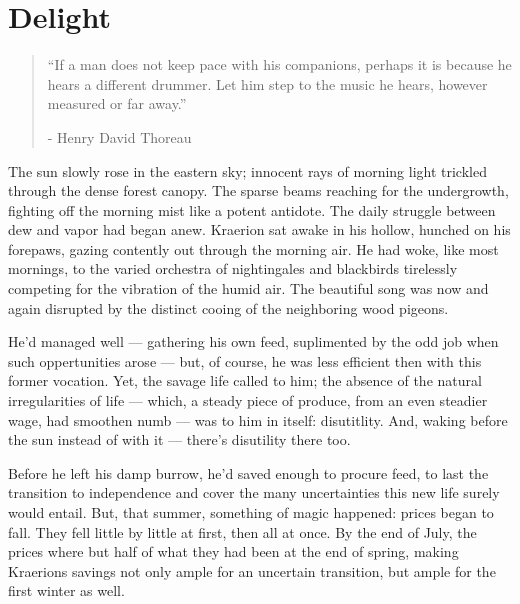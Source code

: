 \chapter{Delight}

\vspace{-1.3cm}
\begin{localsize}{10}
	\begin{quote}
		“If a man does not keep pace with his companions, perhaps it is because he hears a different drummer. Let him step to the music he hears, however measured or far away.”
		\begin{flushright}- Henry David Thoreau \end{flushright}
	\end{quote} 
\end{localsize}
\vspace{1cm}





The sun slowly rose in the eastern sky; innocent rays of morning light trickled through the dense forest canopy. The sparse beams reaching for the undergrowth, fighting off the morning mist like a potent antidote. The daily struggle between dew and vapor had began anew. Kraerion sat awake in his hollow, hunched on his forepaws, gazing contently out through the morning air. He had woke, like most mornings, to the varied orchestra of nightingales and blackbirds tirelessly competing for the vibration of the humid air. The beautiful song was now and again disrupted by the distinct cooing of the neighboring wood pigeons. 
  
He'd managed well — gathering his own feed, suplimented by the odd job when such oppertunities arose — but, of course, he was less efficient then with this former vocation. Yet, the savage life called to him; the absence of the natural irregularities of life — which, a steady piece of produce, from an even steadier wage, had smoothen numb — was to him in itself: disutitlity. And, waking before the sun instead of with it — there's disutility there too.

  Before he left his damp burrow, he'd saved enough to procure feed, to last the transition to independence and cover the many uncertainties this new life surely would entail. But, that summer, something of magic happened: prices began to fall. They fell little by little at first, then all at once. By the end of July, the prices where but half of what they had been at the end of spring, making Kraerions savings not only ample for an uncertain transition, but ample for the first winter as well.

